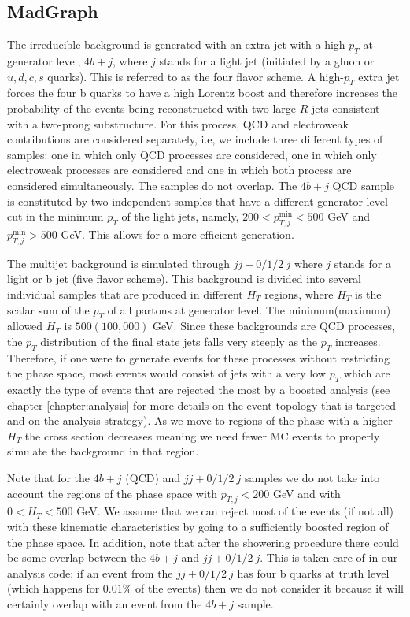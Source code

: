 \subsection{MadGraph}

The irreducible background is generated with an extra jet with a high $p_T$ at generator level, $4b+j$, where $j$ stands for a light jet (initiated by a gluon or $u,d,c,s$ quarks). This is referred to as the four flavor scheme. A high-$p_T$ extra jet forces the four b quarks to have a high Lorentz boost and therefore increases the probability of the events being reconstructed with two large-$R$ jets consistent with a two-prong substructure. For this process, QCD and electroweak contributions are considered separately, i.e, we include three different types of samples: one in which only QCD processes are considered, one in which only electroweak processes are considered and one in which both process are considered simultaneously. The samples do not overlap. The $4b+j$ QCD sample is constituted by two independent samples that have a different generator level cut in the minimum $p_T$ of the light jets, namely, $200<p_{T,j}^{\min}<500$ GeV and $p_{T,j}^{\min}>500$ GeV. This allows for a more efficient generation. 

The multijet background is simulated through $jj+0/1/2 ~j$ where $j$ stands for a light or b jet (five flavor scheme).
This background is divided into several individual samples that are produced in different $H_T$ regions, where $H_T$ is the scalar sum of the $p_T$ of all partons at generator level. The minimum(maximum) allowed $H_T$ is $500(100,000)$ GeV. Since these backgrounds are QCD processes, the $p_T$ distribution of the final state jets falls very steeply as the $p_T$ increases. Therefore, if one were to generate events for these processes without restricting the phase space, most events would consist of jets with a very low $p_T$ which are exactly the type of events that are rejected the most by a boosted analysis (see chapter \ref{chapter:analysis} for more details on the event topology that is targeted and on the analysis strategy). As we move to regions of the phase with a higher $H_T$ the cross section decreases meaning we need fewer MC events to properly simulate the background in that region.

Note that for the $4b+j$ (QCD) and $jj+0/1/2 ~j$ samples we do not take into account the regions of the phase space with $p_{T,j}<200$ GeV and with $0<H_T<500$ GeV. We assume that we can reject most of the events (if not all) with these kinematic characteristics by going to a sufficiently boosted region of the phase space. In addition, note that after the showering procedure there could be some overlap between the $4b+j$ and $jj+0/1/2~ j$. This is taken care of in our analysis code: if an event from the $jj+0/1/2 ~j$ has four b quarks at truth level (which happens for $0.01\%$ of the events) then we do not consider it because it will certainly overlap with an event from the $4b+j$ sample.

